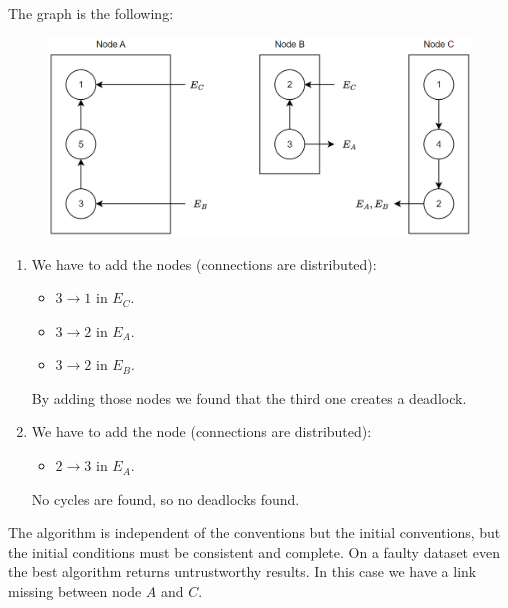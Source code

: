 \documentclass[12pt, a4paper]{report}
\newtheorem[style=M,bodystyle=\normalfont]{theorem}{Theorem}
\newtheorem[style=M,bodystyle=\normalfont]{corollary}{Corollary}
\newtheorem[style=M,bodystyle=\normalfont]{lemma}{Lemma}
\newtheorem[style=M,bodystyle=\normalfont]{definition}{Definition}
\begin{document}
\begin{Answer}[ref=14]
    The graph is the following: 
    \begin{figure}[H]
        \centering
        \includegraphics[width=1\linewidth]{images/Ob4.png}
    \end{figure}
    \begin{enumerate}
        \item We have to add the nodes (connections are distributed): 
            \begin{itemize}
                \item $3 \rightarrow 1$ in $E_C$. 
                \item $3 \rightarrow 2$ in $E_A$. 
                \item $3 \rightarrow 2$ in $E_B$. 
            \end{itemize}
            By adding those nodes we found that the third one creates a deadlock. 
        \item We have to add the node (connections are distributed): 
            \begin{itemize}
                \item $2 \rightarrow 3$ in $E_A$. 
            \end{itemize}
            No cycles are found, so no deadlocks found. 
    \end{enumerate}
    The algorithm is independent of the conventions but the initial conventions, but the initial conditions must be consistent and complete. 
    On a faulty dataset even the best algorithm returns untrustworthy results. In this case we have a link missing between node $A$ and $C$.
\end{Answer}

\newpage
\end{document}
